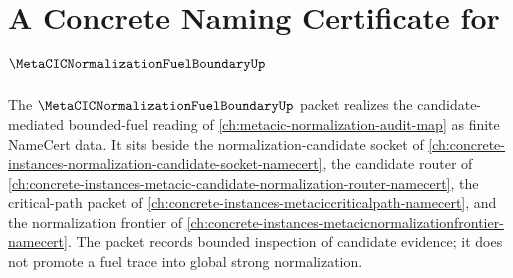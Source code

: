 \chapter{A Concrete Naming Certificate for $\MetaCICNormalizationFuelBoundaryUp$}
\label{ch:concrete-instances-metacic-normalization-fuel-boundary-namecert}

The $\MetaCICNormalizationFuelBoundaryUp$ packet realizes the candidate-mediated bounded-fuel reading of \autoref{ch:metacic-normalization-audit-map} as finite NameCert data. It sits beside the normalization-candidate socket of \autoref{ch:concrete-instances-normalization-candidate-socket-namecert}, the candidate router of \autoref{ch:concrete-instances-metacic-candidate-normalization-router-namecert}, the critical-path packet of \autoref{ch:concrete-instances-metaciccriticalpath-namecert}, and the normalization frontier of \autoref{ch:concrete-instances-metacicnormalizationfrontier-namecert}. The packet records bounded inspection of candidate evidence; it does not promote a fuel trace into global strong normalization.

